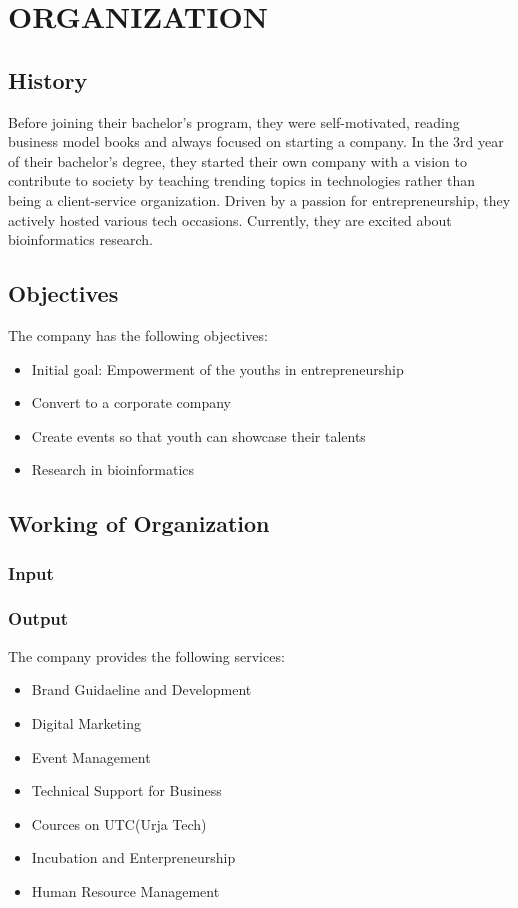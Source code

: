 \chapter{ORGANIZATION}
      \section{History}
      Before joining their bachelor's program, they were self-motivated, reading business model books and always focused on starting a company. In the 3rd year of their bachelor's degree, they started their own company with a vision to contribute to society by teaching trending topics in technologies rather than being a client-service organization. Driven by a passion for entrepreneurship, they actively hosted various tech occasions. Currently, they are excited about bioinformatics research.
      
      \section{Objectives}
      The company has the following objectives:
      \begin{itemize}
        \item Initial goal: Empowerment of the youths in entrepreneurship
        \item Convert to a corporate company
        \item Create events so that youth can showcase their talents
        \item Research in bioinformatics
      \end{itemize}

      \section{Working of Organization}
      \subsection{Input}

      \subsection{Output}
      The company provides the following services:
      \begin{itemize}
        \item Brand Guidaeline and Development
        \item Digital Marketing
        \item Event Management
        \item Technical Support for Business
        \item Cources on UTC(Urja Tech)
        \item Incubation and Enterpreneurship
        \item Human Resource Management
      \end{itemize}

